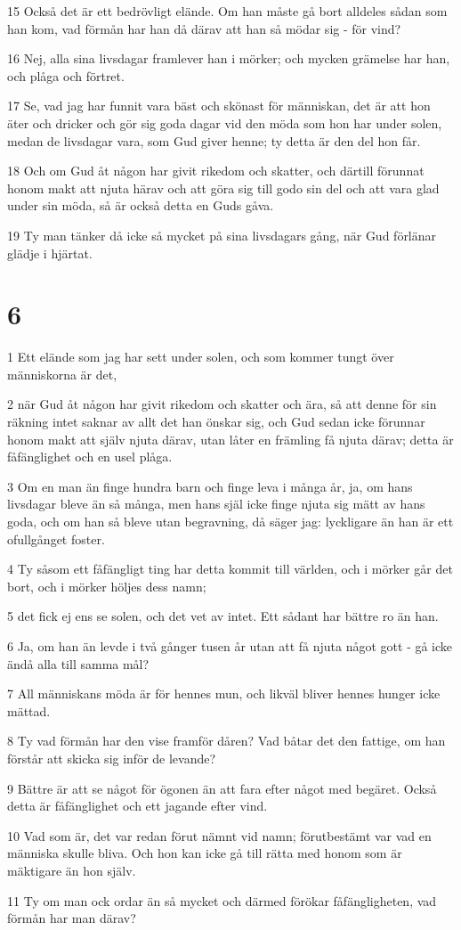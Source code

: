 \par 15 Också det är ett bedrövligt elände. Om han måste gå bort alldeles sådan som han kom, vad förmån har han då därav att han så mödar sig - för vind?
\par 16 Nej, alla sina livsdagar framlever han i mörker; och mycken grämelse har han, och plåga och förtret.
\par 17 Se, vad jag har funnit vara bäst och skönast för människan, det är att hon äter och dricker och gör sig goda dagar vid den möda som hon har under solen, medan de livsdagar vara, som Gud giver henne; ty detta är den del hon får.
\par 18 Och om Gud åt någon har givit rikedom och skatter, och därtill förunnat honom makt att njuta härav och att göra sig till godo sin del och att vara glad under sin möda, så är också detta en Guds gåva.
\par 19 Ty man tänker då icke så mycket på sina livsdagars gång, när Gud förlänar glädje i hjärtat.

\chapter{6}

\par 1 Ett elände som jag har sett under solen, och som kommer tungt över människorna är det,
\par 2 när Gud åt någon har givit rikedom och skatter och ära, så att denne för sin räkning intet saknar av allt det han önskar sig, och Gud sedan icke förunnar honom makt att själv njuta därav, utan låter en främling få njuta därav; detta är fåfänglighet och en usel plåga.
\par 3 Om en man än finge hundra barn och finge leva i många år, ja, om hans livsdagar bleve än så många, men hans själ icke finge njuta sig mätt av hans goda, och om han så bleve utan begravning, då säger jag: lyckligare än han är ett ofullgånget foster.
\par 4 Ty såsom ett fåfängligt ting har detta kommit till världen, och i mörker går det bort, och i mörker höljes dess namn;
\par 5 det fick ej ens se solen, och det vet av intet. Ett sådant har bättre ro än han.
\par 6 Ja, om han än levde i två gånger tusen år utan att få njuta något gott - gå icke ändå alla till samma mål?
\par 7 All människans möda är för hennes mun, och likväl bliver hennes hunger icke mättad.
\par 8 Ty vad förmån har den vise framför dåren? Vad båtar det den fattige, om han förstår att skicka sig inför de levande?
\par 9 Bättre är att se något för ögonen än att fara efter något med begäret. Också detta är fåfänglighet och ett jagande efter vind.
\par 10 Vad som är, det var redan förut nämnt vid namn; förutbestämt var vad en människa skulle bliva. Och hon kan icke gå till rätta med honom som är mäktigare än hon själv.
\par 11 Ty om man ock ordar än så mycket och därmed förökar fåfängligheten, vad förmån har man därav?

